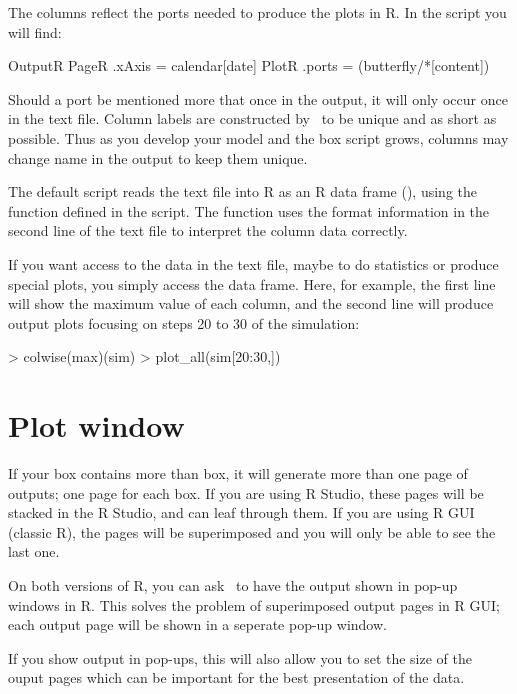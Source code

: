 The columns reflect the ports needed to produce the plots in R. In the  script you will find:
\lstset{numbers=left}
\begin{boxscript}
OutputR {
  PageR {
    .xAxis = calendar[date]
    PlotR {
      .ports = (butterfly/*[content])
    }
  }
}\end{boxscript}
\lstset{numbers=none}

Should a port be mentioned more that once in the output, it will only occur once in the text file. Column labels are constructed by \US\ to be unique and as short as possible. Thus as you develop your model and the box script grows, columns may change name in the output to keep them unique.

The default  script reads the text file into R as an R data frame (), using the  function defined in the  script. The  function uses the format information in the second line of the text file to interpret the column data correctly. 
 
If you want access to the data in the text file, maybe to do statistics or produce special plots, you simply access the  data frame. Here, for example, the first line will show the maximum value of each column, and the second line will produce output plots focusing on steps 20 to 30 of the simulation:
\lstset{numbers=left}
\begin{rscript}
> colwise(max)(sim)
> plot_all(sim[20:30,])
\end{rscript}
\lstset{numbers=none}

\section{Plot window}
If your  box contains more than  box, it will generate more than one page of outputs; one page for each  box. If you are using R Studio, these pages will be stacked in the R Studio, and can leaf through them. If you are using R GUI (classic R), the pages will be superimposed and you will only be able to see the last one.

On both versions of R, you can ask \US\ to have the output shown in pop-up windows in R. This solves the problem of superimposed output pages in R GUI; each output page will be shown in a seperate pop-up window.

If you show output in pop-ups, this will also allow you to set the size of the ouput pages which can be important for the best presentation of the data.

